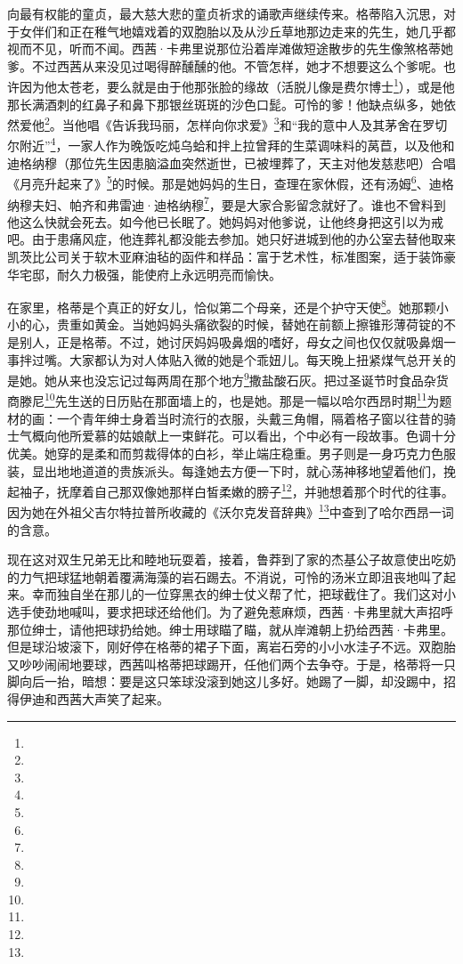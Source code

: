 \par 向最有权能的童贞，最大慈大悲的童贞祈求的诵歌声继续传来。格蒂陷入沉思，对于女伴们和正在稚气地嬉戏着的双胞胎以及从沙丘草地那边走来的先生，她几乎都视而不见，听而不闻。西茜·卡弗里说那位沿着岸滩做短途散步的先生像煞格蒂她爹。不过西茜从来没见过喝得醉醺醺的他。不管怎样，她才不想要这么个爹呢。也许因为他太苍老，要么就是由于他那张脸的缘故（活脱儿像是费尔博士\footnote{}），或是他那长满酒刺的红鼻子和鼻下那银丝斑斑的沙色口髭。可怜的爹！他缺点纵多，她依然爱他\footnote{}。当他唱《告诉我玛丽，怎样向你求爱》\footnote{}和“我的意中人及其茅舍在罗切尔附近”\footnote{}，一家人作为晚饭吃炖乌蛤和拌上拉曾拜的生菜调味料的莴苣，以及他和迪格纳穆（那位先生因患脑溢血突然逝世，已被埋葬了，天主对他发慈悲吧）合唱《月亮升起来了》\footnote{}的时候。那是她妈妈的生日，查理在家休假，还有汤姆\footnote{}、迪格纳穆夫妇、帕齐和弗雷迪·迪格纳穆\footnote{}，要是大家合影留念就好了。谁也不曾料到他这么快就会死去。如今他已长眠了。她妈妈对他爹说，让他终身把这引以为戒吧。由于患痛风症，他连葬礼都没能去参加。她只好进城到他的办公室去替他取来凯茨比公司关于软木亚麻油毡的函件和样品：富于艺术性，标准图案，适于装饰豪华宅邸，耐久力极强，能使府上永远明亮而愉快。
\par 在家里，格蒂是个真正的好女儿，恰似第二个母亲，还是个护守天使\footnote{}。她那颗小小的心，贵重如黄金。当她妈妈头痛欲裂的时候，替她在前额上擦锥形薄荷锭的不是别人，正是格蒂。不过，她讨厌妈妈吸鼻烟的嗜好，母女之间也仅仅就吸鼻烟一事拌过嘴。大家都认为对人体贴入微的她是个乖妞儿。每天晚上扭紧煤气总开关的是她。她从来也没忘记过每两周在那个地方\footnote{}撒盐酸石灰。把过圣诞节时食品杂货商滕尼\footnote{}先生送的日历贴在那面墙上的，也是她。那是一幅以哈尔西昂时期\footnote{}为题材的画：一个青年绅士身着当时流行的衣服，头戴三角帽，隔着格子窗以往昔的骑士气概向他所爱慕的姑娘献上一束鲜花。可以看出，个中必有一段故事。色调十分优美。她穿的是柔和而剪裁得体的白衫，举止端庄稳重。男子则是一身巧克力色服装，显出地地道道的贵族派头。每逢她去方便一下时，就心荡神移地望着他们，挽起袖子，抚摩着自己那双像她那样白皙柔嫩的膀子\footnote{}，并驰想着那个时代的往事。因为她在外祖父吉尔特拉普所收藏的《沃尔克发音辞典》\footnote{}中查到了哈尔西昂一词的含意。
\par 现在这对双生兄弟无比和睦地玩耍着，接着，鲁莽到了家的杰基公子故意使出吃奶的力气把球猛地朝着覆满海藻的岩石踢去。不消说，可怜的汤米立即沮丧地叫了起来。幸而独自坐在那儿的一位穿黑衣的绅士仗义帮了忙，把球截住了。我们这对小选手使劲地喊叫，要求把球还给他们。为了避免惹麻烦，西茜·卡弗里就大声招呼那位绅士，请他把球扔给她。绅士用球瞄了瞄，就从岸滩朝上扔给西茜·卡弗里。但是球沿坡滚下，刚好停在格蒂的裙子下面，离岩石旁的小小水洼子不远。双胞胎又吵吵闹闹地要球，西茜叫格蒂把球踢开，任他们两个去争夺。于是，格蒂将一只脚向后一抬，暗想：要是这只笨球没滚到她这儿多好。她踢了一脚，却没踢中，招得伊迪和西茜大声笑了起来。
